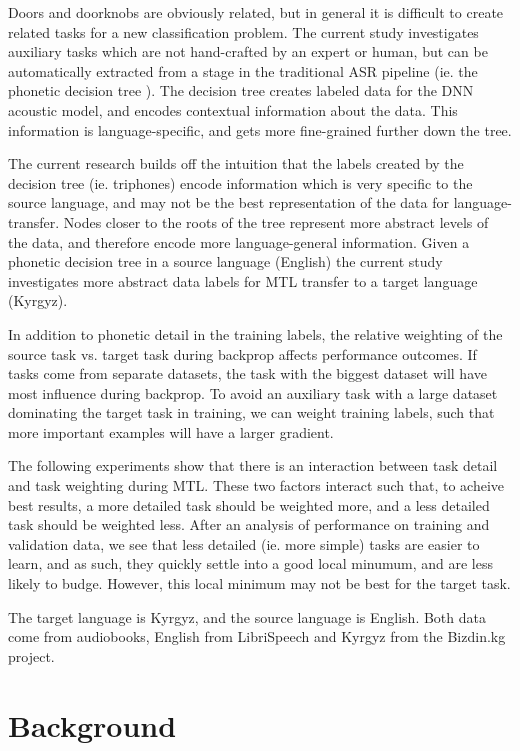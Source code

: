 \documentclass[a4paper]{article}
\begin{document}
Doors and doorknobs are obviously related, but in general it is difficult to create related tasks for a new classification problem. The current study investigates auxiliary tasks which are not hand-crafted by an expert or human, but can be automatically extracted from a stage in the traditional ASR pipeline (ie. the phonetic decision tree \cite{young1994tree}). The decision tree creates labeled data for the DNN acoustic model, and encodes contextual information about the data. This information is language-specific, and gets more fine-grained further down the tree.

The current research builds off the intuition that the labels created by the decision tree (ie. triphones) encode information which is very specific to the source language, and may not be the best representation of the data for language-transfer. Nodes closer to the roots of the tree represent more abstract levels of the data, and therefore encode more language-general information. Given a phonetic decision tree in a source language (English) the current study investigates more abstract data labels for MTL transfer to a target language (Kyrgyz).

In addition to phonetic detail in the training labels, the relative weighting of the source task vs. target task during backprop affects performance outcomes. If tasks come from separate datasets, the task with the biggest dataset will have most influence during backprop. To avoid an auxiliary task with a large dataset dominating the target task in training, we can weight training labels, such that more important examples will have a larger gradient.

The following experiments show that there is an interaction between task detail and task weighting during MTL. These two factors interact such that, to acheive best results, a more detailed task should be weighted more, and a less detailed task should be weighted less. After an analysis of performance on training and validation data, we see that less detailed (ie. more simple) tasks are easier to learn, and as such, they quickly settle into a good local minumum, and are less likely to budge. However, this local minimum may not be best for the target task.

The target language is Kyrgyz, and the source language is English. Both data come from audiobooks, English from LibriSpeech \cite{panayotov2015} and Kyrgyz from the Bizdin.kg project.




\section{Background}
\end{document}
